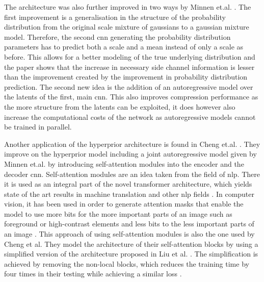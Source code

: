 The architecture was also further improved in two ways by Minnen et.al. \citep{minnen_joint_2018}. The first improvement is a generalisation in the structure of the probability distribution from the original scale mixture of gaussians \citep{wainwright_scale_1999} to a gaussian mixture model. Therefore, the second \ac{cnn} generating the probability distribution parameters has to predict both a scale and a mean instead of only a scale as before. This allows for a better modeling of the true underlying distribution and the paper shows that the increase in necessary side channel information is lesser than the improvement created by the improvement in probability distribution prediction.
The second new idea is the addition of an autoregressive model over the latents of the first, main \ac{cnn}. This also improves compression performance as the more structure from the latents can be exploited, it does however also increase the computational costs of the network as autoregressive models cannot be trained in parallel. 

Another application of the hyperprior architecture is found in Cheng et.al. \citep{cheng_learned_2020}. They improve on the hyperprior model including a joint autoregressive model given by Minnen et.al. \citep{minnen_joint_2018} by introducing self-attention modules into the encoder and the decoder \ac{cnn}. Self-attention modules are an idea taken from the field of \ac{nlp}. There it is used as an integral part of the novel transformer architecture, which yields state of the art results in machine translation and other \ac{nlp} fields \citep{vaswani_attention_2017}. In computer vision, it has been used in order to generate attention masks that enable the model to use more bits for the more important parts of an image such as foreground or high-contrast elements and less bits to the less important parts of an image \citep{liu_non-local_2019,li_learning_2017,mentzer_conditional_2019}. This approach of using self-attention modules is also the one used by Cheng et al. They model the architecture of their self-attention blocks by using a simplified version of the architecture proposed in Liu et al. \citep{liu_non-local_2019}. The simplification is achieved by removing the non-local blocks, which reduces the training time by four times in their testing while achieving a similar loss \citep{cheng_learned_2020}.